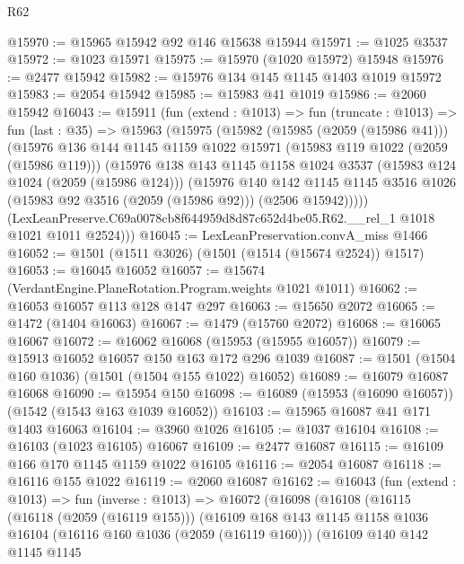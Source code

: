 \begin{lexlean}{R62}
\begin{coremodule}
@15970 := @15965 @15942 @92 @146 @15638 @15944
@15971 := @1025 @3537
@15972 := @1023 @15971
@15975 := @15970 (@1020 @15972) @15948
@15976 := @2477 @15942
@15982 := @15976 @134 @145 @1145 @1403 @1019 @15972
@15983 := @2054 @15942
@15985 := @15983 @41 @1019
@15986 := @2060 @15942
@16043 := @15911
    (fun (extend : @1013) =>
    fun (truncate : @1013) =>
    fun (last : @35) =>
    @15963
      (@15975
        (@15982
          (@15985 (@2059 (@15986 @41)))
          (@15976
            @136
            @144
            @1145
            @1159
            @1022
            @15971
            (@15983 @119 @1022 (@2059 (@15986 @119)))
            (@15976
              @138
              @143
              @1145
              @1158
              @1024
              @3537
              (@15983 @124 @1024 (@2059 (@15986 @124)))
              (@15976
                @140
                @142
                @1145
                @1145
                @3516
                @1026
                (@15983 @92 @3516 (@2059 (@15986 @92)))
                (@2506 @15942)))))
        (LexLeanPreserve.C69a0078cb8f644959d8d87c652d4be05.R62.__rel_1 @1018 @1021 @1011 @2524)))
@16045 := LexLeanPreservation.convA_miss @1466
@16052 := @1501 (@1511 @3026) (@1501 (@1514 (@15674 @2524)) @1517)
@16053 := @16045 @16052
@16057 := @15674 (VerdantEngine.PlaneRotation.Program.weights @1021 @1011)
@16062 := @16053 @16057 @113 @128 @147 @297
@16063 := @15650 @2072
@16065 := @1472 (@1404 @16063)
@16067 := @1479 (@15760 @2072)
@16068 := @16065 @16067
@16072 := @16062 @16068 (@15953 (@15955 @16057))
@16079 := @15913 @16052 @16057 @150 @163 @172 @296 @1039
@16087 := @1501 (@1504 @160 @1036) (@1501 (@1504 @155 @1022) @16052)
@16089 := @16079 @16087 @16068
@16090 := @15954 @150
@16098 := @16089 (@15953 (@16090 @16057)) (@1542 (@1543 @163 @1039 @16052))
@16103 := @15965 @16087 @41 @171 @1403 @16063
@16104 := @3960 @1026
@16105 := @1037 @16104
@16108 := @16103 (@1023 @16105) @16067
@16109 := @2477 @16087
@16115 := @16109 @166 @170 @1145 @1159 @1022 @16105
@16116 := @2054 @16087
@16118 := @16116 @155 @1022
@16119 := @2060 @16087
@16162 := @16043
    (fun (extend : @1013) =>
    fun (inverse : @1013) =>
    @16072
      (@16098
        (@16108
          (@16115
            (@16118 (@2059 (@16119 @155)))
            (@16109
              @168
              @143
              @1145
              @1158
              @1036
              @16104
              (@16116 @160 @1036 (@2059 (@16119 @160)))
              (@16109
                @140
                @142
                @1145
                @1145

\end{coremodule}
\end{lexlean}
